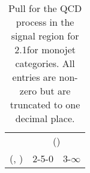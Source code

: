 \begin{table}[h!]
\tiny
\centering
\caption{Pull for the QCD process in the signal region for 2.1\ifb for monojet categories. All entries are non-zero but are truncated to one decimal place.\label{tab:pullsep_sig_qcd_mono}}
\begin{tabular}
{ccc}
	\hline\hline
	& \multicolumn{2}{c}{\scalht (\gev)} \\ 
	 (\njet,  \nb) & 2-5-0 & 3-$\infty$ \\ [0.8ex] 
\hline
	\hline
	\hline
\end{tabular}
\end{table}
